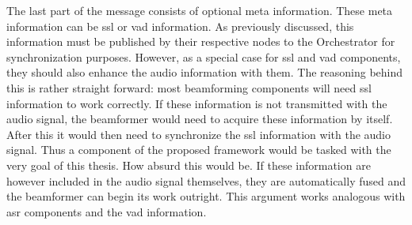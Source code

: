 The last part of the message consists of optional meta information.
These meta information can be \gls{ssl} or \gls{vad} information.
As previously discussed, this information must be published by their respective nodes to the Orchestrator for synchronization purposes.
However, as a special case for \gls{ssl} and \gls{vad} components, they should also enhance the audio information with them.
The reasoning behind this is rather straight forward:
most beamforming components will need \gls{ssl} information to work correctly.
If these information is not transmitted with the audio signal, the beamformer would need to acquire these information by itself.
After this it would then need to synchronize the \gls{ssl} information with the audio signal.
Thus a component of the proposed framework would be tasked with the very goal of this thesis.
How absurd this would be.
If these information are however included in the audio signal themselves, they are automatically fused and the beamformer can begin its work outright.
This argument works analogous with \gls{asr} components and the \gls{vad} information.

